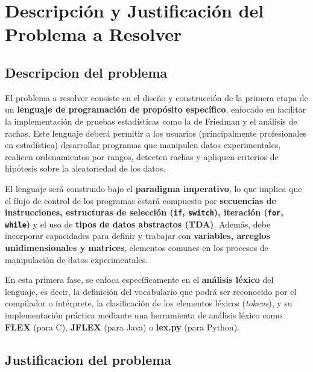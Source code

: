 \documentclass{article}
\begin{document}

\section{Descripción y Justificación del Problema a Resolver}\label{sec:descr}

\subsection{Descripcion del problema}

El problema a resolver consiste en el diseño y construcción de la primera etapa de un \textbf{lenguaje de programación de propósito específico}, enfocado en facilitar la implementación de pruebas estadísticas como la de Friedman y el análisis de rachas. Este lenguaje deberá permitir a los usuarios (principalmente profesionales en estadística) desarrollar programas que manipulen datos experimentales, realicen ordenamientos por rangos, detecten rachas y apliquen criterios de hipótesis sobre la aleatoriedad de los datos.

El lenguaje será construido bajo el \textbf{paradigma imperativo}, lo que implica que el flujo de control de los programas estará compuesto por \textbf{secuencias de instrucciones, estructuras de selección (\texttt{if}, \texttt{switch}), iteración (\texttt{for}, \texttt{while})} y el uso de \textbf{tipos de datos abstractos (TDA)}. Además, debe incorporar capacidades para definir y trabajar con \textbf{variables, arreglos unidimensionales y matrices}, elementos comunes en los procesos de manipulación de datos experimentales.

En esta primera fase, se enfoca específicamente en el \textbf{análisis léxico} del lenguaje, es decir, la definición del vocabulario que podrá ser reconocido por el compilador o intérprete, la clasificación de los elementos léxicos (\emph{tokens}), y su implementación práctica mediante una herramienta de análisis léxico como \textbf{FLEX} (para C), \textbf{JFLEX} (para Java) o \textbf{lex.py} (para Python).

\subsection{Justificacion del problema}
\end{document}
